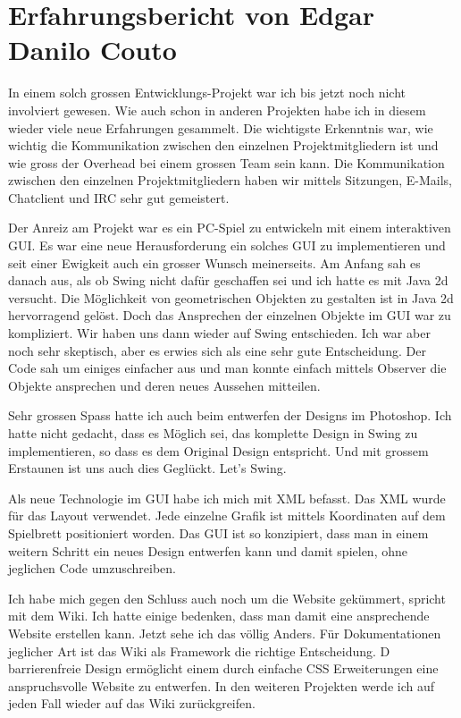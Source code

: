 \documentclass[12pt,halfparskip]{scrartcl}
\begin{document}


\section{Erfahrungsbericht von Edgar Danilo Couto}

In einem solch grossen Entwicklungs-Projekt war ich bis jetzt noch nicht involviert gewesen. Wie auch schon in anderen Projekten habe ich in diesem wieder viele neue Erfahrungen gesammelt. Die wichtigste Erkenntnis war, wie wichtig die Kommunikation zwischen den einzelnen Projektmitgliedern ist und wie gross der Overhead bei einem grossen Team sein kann. Die Kommunikation zwischen den einzelnen Projektmitgliedern haben wir mittels Sitzungen, E-Mails, Chatclient und IRC sehr gut gemeistert.

Der Anreiz am Projekt war es ein PC-Spiel zu entwickeln mit einem interaktiven GUI. Es war eine neue Herausforderung ein solches GUI zu implementieren und seit einer Ewigkeit auch ein grosser Wunsch meinerseits. Am Anfang sah es danach aus, als ob Swing nicht dafür geschaffen sei und ich hatte es mit Java 2d versucht. Die Möglichkeit von geometrischen Objekten zu gestalten ist in Java 2d hervorragend gelöst. Doch das Ansprechen der einzelnen Objekte im GUI war zu kompliziert. Wir haben uns dann wieder auf  Swing entschieden. Ich war aber noch sehr skeptisch, aber es erwies sich als eine sehr gute Entscheidung. Der Code sah um einiges einfacher aus und man konnte einfach mittels Observer die Objekte ansprechen und deren neues Aussehen mitteilen. 

Sehr grossen Spass hatte ich auch beim entwerfen der Designs im Photoshop. Ich hatte nicht gedacht, dass es Möglich sei, das komplette Design in Swing zu implementieren, so dass es dem Original Design entspricht. Und mit grossem Erstaunen ist uns auch dies Geglückt. Let’s Swing. 

Als neue Technologie im GUI habe ich mich mit XML befasst. Das XML wurde für das Layout verwendet. Jede einzelne Grafik ist mittels Koordinaten auf dem Spielbrett positioniert worden. Das GUI ist so konzipiert, dass man in einem weitern Schritt ein neues Design entwerfen kann und damit spielen, ohne jeglichen Code umzuschreiben.

Ich habe mich gegen den Schluss auch noch um die Website gekümmert, spricht mit dem Wiki. Ich hatte einige bedenken, dass man damit eine ansprechende Website erstellen kann. Jetzt sehe ich das völlig Anders. Für Dokumentationen jeglicher Art ist das Wiki als Framework die richtige Entscheidung. D barrierenfreie Design ermöglicht einem durch einfache CSS Erweiterungen eine anspruchsvolle Website zu entwerfen. In den weiteren Projekten werde ich auf jeden Fall wieder auf das Wiki zurückgreifen.
\end{document}
